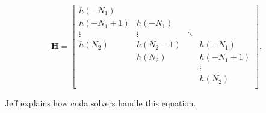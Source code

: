 \begin{equation}
\mathbf{H} = 
		\begin{bmatrix}
		h(-N_1)		&  			& 		 	&  			\\
		h(-N_1+1) 	& h(-N_1)	& 		 	&  			\\
		\vdots	 	& \vdots	& \ddots 	&  			\\
		h(N_2)		& h(N_2-1) 	&  			& h(-N_1)  	\\
		 			& h(N_2) 	&  			& h(-N_1+1) \\
		 			&  	   		&  			& \vdots	\\
		 			&  	   		&  			& h(N_2)	\\
	\end{bmatrix}.
\end{equation}

Jeff explains how cuda solvers handle this equation.

